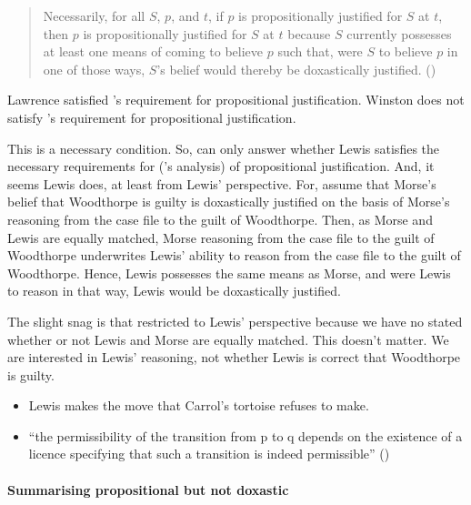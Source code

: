 \documentclass[10pt]{article}
\newcommand{\hozlinedash}[0]{%
  \noindent\hdashrule[0.5ex][c]{\textwidth}{.1pt}{2.5pt}
}
\begin{document}
\begin{quote}
  Necessarily, for all \(S\), \(p\), and \(t\), if \(p\) is propositionally justified for \(S\) at \(t\), then \(p\) is propositionally justified for \(S\) at \(t\) because \(S\) currently possesses at least one means of coming to believe \(p\) such that, were \(S\) to believe \(p\) in one of those ways, \(S\)'s belief would thereby be doxastically justified.\nolinebreak
  \mbox{}\hfill\mbox{(\citeyear[320]{Turri:2010aa})}
\end{quote}

Lawrence satisfied \citeauthor{Turri:2010aa}'s requirement for propositional justification.
Winston does not satisfy \citeauthor{Turri:2010aa}'s requirement for propositional justification.


This is a necessary condition.
So, can only answer whether Lewis satisfies the necessary requirements for (\citeauthor{Turri:2010aa}'s analysis) of propositional justification.
And, it seems Lewis does, at least from Lewis' perspective.
For, assume that Morse's belief that Woodthorpe is guilty is doxastically justified on the basis of Morse's reasoning from the case file to the guilt of Woodthorpe.
Then, as Morse and Lewis are equally matched, Morse reasoning from the case file to the guilt of Woodthorpe underwrites Lewis' ability to reason from the case file to the guilt of Woodthorpe.
Hence, Lewis possesses the same means as Morse, and were Lewis to reason in that way, Lewis would be doxastically justified.

The slight snag is that restricted to Lewis' perspective because we have no stated whether or not Lewis and Morse are equally matched.
This doesn't matter.
We are interested in Lewis' reasoning, not whether Lewis is correct that Woodthorpe is guilty.

\hozlinedash

\begin{itemize}
\item Lewis makes the move that Carrol's tortoise refuses to make.
\item ``the permissibility of the transition from p to q depends on the existence of a licence specifying that such a transition is indeed permissible'' (\cite[459]{Simchen:2001aa})
\end{itemize}

\hozlinedash

\paragraph{Summarising propositional but not doxastic}
\end{document}

